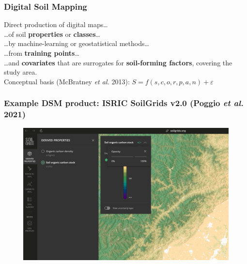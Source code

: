 \documentclass[aspectratio=169, 10pt]{beamer}
\begin{document}
\begin{frame}
\frametitle{Digital Soil Mapping}

Direct production of digital maps\ldots\\
\ldots of soil \textbf{properties} or \textbf{classes}\ldots\\
\ldots by machine-learning or geostatistical methods\ldots\\
\ldots from \textbf{training points}\ldots\\
\ldots and \textbf{covariates} that are surrogates for \textbf{soil-forming factors}, covering the study area.
\\[2ex]
Conceptual basis (McBratney \textit{et al.} 2013): $S = f(s, c, o, r, p, a, n) + \varepsilon$ 
\end{frame}



\begin{frame}
  \frametitle{Example DSM product: ISRIC SoilGrids v2.0 (Poggio \emph{et al.} 2021)}
\begin{figure}
    \centering
\includegraphics[height=0.75\textheight]{./graphics_david/SoilGrids_SOCstock_Chengdu.png}
\end{figure}
\end{frame}
\end{document}
